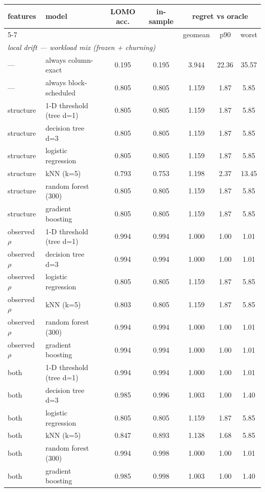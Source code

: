 \begin{tabular}{llccccc}
\toprule
features & model & LOMO acc. & in-sample & \multicolumn{3}{c}{regret vs oracle}\\
\cmidrule(lr){5-7}
 & & & & geomean & p90 & worst \\
\midrule
\multicolumn{7}{l}{\emph{local drift --- workload mix (frozen + churning)}}\\
\midrule
--- & always column-exact & 0.195 & 0.195 & 3.944 & 22.36 & 35.57 \\
--- & always block-scheduled & 0.805 & 0.805 & 1.159 & 1.87 & 5.85 \\
structure & 1-D threshold (tree d=1) & 0.805 & 0.805 & 1.159 & 1.87 & 5.85 \\
structure & decision tree d=3 & 0.805 & 0.805 & 1.159 & 1.87 & 5.85 \\
structure & logistic regression & 0.805 & 0.805 & 1.159 & 1.87 & 5.85 \\
structure & kNN (k=5) & 0.793 & 0.753 & 1.198 & 2.37 & 13.45 \\
structure & random forest (300) & 0.805 & 0.805 & 1.159 & 1.87 & 5.85 \\
structure & gradient boosting & 0.805 & 0.805 & 1.159 & 1.87 & 5.85 \\
observed $\rho$ & 1-D threshold (tree d=1) & 0.994 & 0.994 & 1.000 & 1.00 & 1.01 \\
observed $\rho$ & decision tree d=3 & 0.994 & 0.994 & 1.000 & 1.00 & 1.01 \\
observed $\rho$ & logistic regression & 0.805 & 0.805 & 1.159 & 1.87 & 5.85 \\
observed $\rho$ & kNN (k=5) & 0.803 & 0.805 & 1.159 & 1.87 & 5.85 \\
observed $\rho$ & random forest (300) & 0.994 & 0.994 & 1.000 & 1.00 & 1.01 \\
observed $\rho$ & gradient boosting & 0.994 & 0.994 & 1.000 & 1.00 & 1.01 \\
both & 1-D threshold (tree d=1) & 0.994 & 0.994 & 1.000 & 1.00 & 1.01 \\
both & decision tree d=3 & 0.985 & 0.996 & 1.003 & 1.00 & 1.40 \\
both & logistic regression & 0.805 & 0.805 & 1.159 & 1.87 & 5.85 \\
both & kNN (k=5) & 0.847 & 0.893 & 1.138 & 1.68 & 5.85 \\
both & random forest (300) & 0.994 & 0.998 & 1.000 & 1.00 & 1.01 \\
both & gradient boosting & 0.985 & 0.998 & 1.003 & 1.00 & 1.40 \\

\end{tabular}
